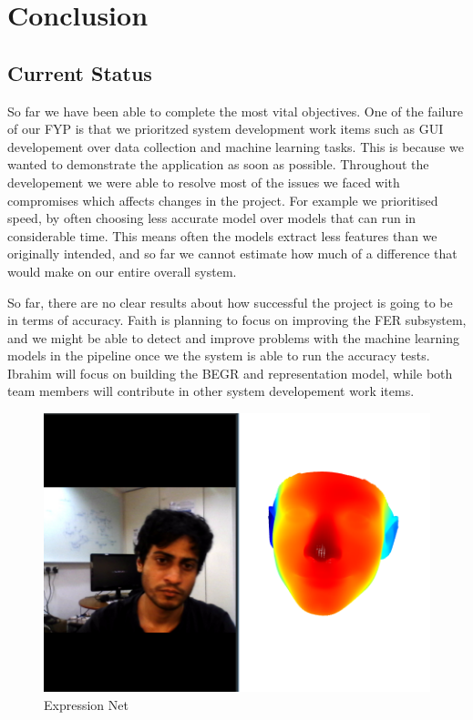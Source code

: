 \documentclass[12pt,a4paper,man]{report}
\begin{document}
\part{Conclusion}
\label{sec:org8524708}
\chapter{Current Status}
\label{sec:org6faabc6}
   So far we have been able to complete the most vital objectives. One of the failure of our FYP is that we prioritzed system development work items such as GUI developement over 
data collection and machine learning tasks. This is because we wanted to demonstrate the application as soon as possible.  
  Throughout the developement we were able to resolve most of the issues we faced with compromises which affects changes in the project. For example we prioritised speed, by often choosing less accurate model over models that can run in considerable time. This means often the models extract less features than we originally intended, and so far we cannot estimate how much of a difference that would make on our entire overall system.

So far, there are no clear results about how successful the project is going to be in terms of accuracy. Faith is planning to focus on improving the FER subsystem, and we might be able to detect and improve problems with the machine learning models in the pipeline once we the system is able to run the accuracy tests. Ibrahim will focus on building the BEGR and representation model, while both team members will contribute in other system developement work items.

\begin{figure}[htbp]
\centering
\includegraphics[width=7in]{./ext_img/expr_net.png}
\caption{\label{fig:exprnet}
Expression Net}
\end{figure}
\end{document}
